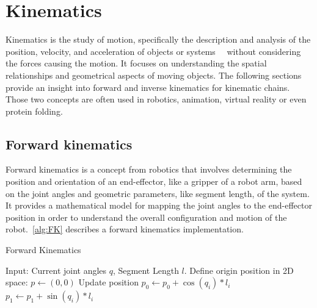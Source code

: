 % 

% 

\section{Kinematics}

Kinematics is the study of motion, specifically the description and analysis of the position, velocity, and acceleration of objects or systems~\cite{ForwardKinematics}~\cite{CCD} without considering the forces causing the motion. It focuses on understanding the spatial relationships and geometrical aspects of moving objects. The following sections provide an insight into forward and inverse kinematics for kinematic chains. Those two concepts are often used in robotics, animation, virtual reality or even protein folding. 

\subsection{Forward kinematics}

Forward kinematics is a concept from robotics that involves determining the position and orientation of an end-effector, like a gripper of a robot arm, based on the joint angles and geometric parameters, like segment length, of the system. It provides a mathematical model for mapping the joint angles to the end-effector position in order to understand the overall configuration and motion of the robot.~\eqref{alg:FK} describes a forward kinematics implementation. 
% 

\begin{algorithm}
    \caption{Forward Kinematics}\label{alg:FK}
    \begin{algorithmic}
        \State{} Input: Current joint angles $q$, Segment Length $l$.
        \State{} Define origin position in 2D space: $p \leftarrow (0, 0)$
            \State{} Update position
            \State{} $p_0 \leftarrow p_0 + \cos(q_i) * l_i$
            \State{} $p_1 \leftarrow p_1 + \sin(q_i) * l_i$
        \EndFor{}
\end{algorithmic}
\end{algorithm}

